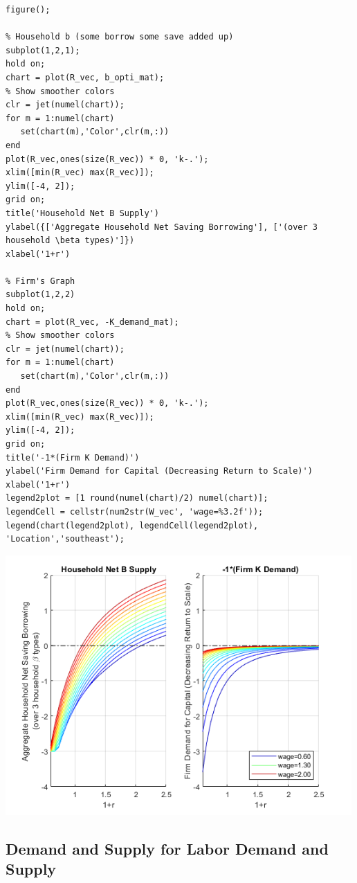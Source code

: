 \documentclass[
]{book}
\begin{document}
\begin{verbatim}
figure();

% Household b (some borrow some save added up)
subplot(1,2,1);
hold on;
chart = plot(R_vec, b_opti_mat);
% Show smoother colors
clr = jet(numel(chart));
for m = 1:numel(chart)
   set(chart(m),'Color',clr(m,:))
end
plot(R_vec,ones(size(R_vec)) * 0, 'k-.');
xlim([min(R_vec) max(R_vec)]);
ylim([-4, 2]);
grid on;
title('Household Net B Supply')
ylabel({['Aggregate Household Net Saving Borrowing'], ['(over 3 household \beta types)']})
xlabel('1+r')

% Firm's Graph
subplot(1,2,2)
hold on;
chart = plot(R_vec, -K_demand_mat);
% Show smoother colors
clr = jet(numel(chart));
for m = 1:numel(chart)
   set(chart(m),'Color',clr(m,:))
end
plot(R_vec,ones(size(R_vec)) * 0, 'k-.');
xlim([min(R_vec) max(R_vec)]);
ylim([-4, 2]);
grid on;
title('-1*(Firm K Demand)')
ylabel('Firm Demand for Capital (Decreasing Return to Scale)')
xlabel('1+r')
legend2plot = [1 round(numel(chart)/2) numel(chart)];
legendCell = cellstr(num2str(W_vec', 'wage=%3.2f'));
legend(chart(legend2plot), legendCell(legend2plot), 'Location','southeast');
\end{verbatim}

\includegraphics[width=5.20833in,height=\textheight]{img/equilibrium_constrainedborrow_labor_images/figure_0.png}

\hypertarget{demand-and-supply-for-labor-demand-and-supply}{%
\subsection{Demand and Supply for Labor Demand and Supply}\label{demand-and-supply-for-labor-demand-and-supply}}
\end{document}
